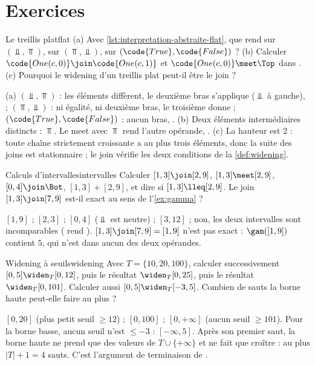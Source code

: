 \section*{Exercices}

\begin{exercice}{Le treillis plat}{flat}
  (a) Avec \cref{lst:interpretation-abstraite-flat}, que rend
   sur $(\Bot, \Top)$, sur $(\Top, \Bot)$, sur
  $(\code{True}, \code{False})$ ? (b) Calculer
  $\code{One(c,0)} \join \code{One(c,1)}$ et $\code{One(c,0)} \meet \Top$ dans
  . (c) Pourquoi le widening d'un treillis plat peut-il être
  le join ?
\end{exercice}
\begin{solution}
  (a) $(\Bot,\Top)$ : les éléments diffèrent, le deuxième bras
  s'applique (\og $\Bot$ à gauche\fg{}),  ;
  $(\Top,\Bot)$ : ni égalité, ni deuxième bras, le troisième donne
   ; $(\code{True},\code{False})$ : aucun bras,
  . (b) Deux éléments intermédiaires distincts : $\Top$. Le meet
  avec $\Top$ rend l'autre opérande, . (c) La hauteur est 2 :
  toute chaîne strictement croissante a au plus trois éléments, donc la suite
  des joins est stationnaire ; le join vérifie les deux conditions de la
  \cref{def:widening}.
\end{solution}

\begin{exercice}{Calculs d'intervalles}{intervalles}
  Calculer $[1,3] \join [2,9]$, $[1,3] \meet [2,9]$, $[0,4] \join \Bot$,
  $[1,3] + [2,9]$, et dire si $[1,3] \lleq [2,9]$. Le join
  $[1,3] \join [7,9]$ est-il exact au sens de l'\cref{ex:gamma} ?
\end{exercice}
\begin{solution}
  $[1,9]$ ; $[2,3]$ ; $[0,4]$ ($\Bot$ est neutre) ; $[3,12]$ ; non, les deux
  intervalles sont incomparables ( rend ).
  $[1,3] \join [7,9] = [1,9]$ n'est pas exact : $\gam([1,9])$ contient $5$, qui
  n'est dans aucun des deux opérandes.
\end{solution}

\begin{exercice}{Widening à seuils}{widening}
  Avec $T = \{10, 20, 100\}$, calculer successivement
  $[0,5] \widen_T [0,12]$, puis le résultat $\widen_T [0,25]$, puis le
  résultat $\widen_T [0,101]$. Calculer aussi $[0,5] \widen_T [-3,5]$.
  Combien de sauts la borne haute peut-elle faire au plus ?
\end{exercice}
\begin{solution}
  $[0,20]$ (plus petit seuil $\ge 12$) ; $[0,100]$ ; $[0,+\infty]$ (aucun seuil
  $\ge 101$). Pour la borne basse, aucun seuil n'est $\le -3$ :
  $[-\infty, 5]$. Après son premier saut, la borne haute ne prend que des
  valeurs de $T \cup \{+\infty\}$ et ne fait que croître : au plus
  $|T| + 1 = 4$ sauts. C'est l'argument de terminaison de .
\end{solution}

